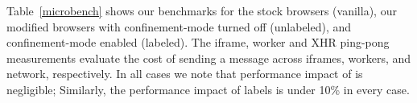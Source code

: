 Table~\ref{microbench} shows our benchmarks for the stock browsers
(vanilla), our modified browsers with confinement-mode turned off
(unlabeled), and confinement-mode enabled (labeled).
%
The iframe, worker and XHR ping-pong measurements evaluate the cost of 
sending a message across iframes, workers, and network, respectively.
%
In all cases we note that performance impact of \sys{} is negligible;
Similarly, the performance impact of labels is under 10\%  in every
case.
